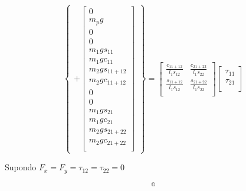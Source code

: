 \documentclass[12pt,a4paper]{article}
\begin{document}
\begin{equation}
\begin{Bmatrix}
	+
	\begin{bmatrix}
	0 \\
	m_p g \\
	0 \\
	0 \\
	m_1 g s_{11} \\
	m_1 g c_{11} \\
	m_2 g s_{11+12} \\
	m_2 g c_{11+12} \\
	0 \\
	0 \\
	m_1 g s_{21} \\
	m_1 g c_{21} \\
	m_2 g s_{21+22} \\
	m_2 g c_{21+22} \\
	\end{bmatrix}
\end{Bmatrix}
=
\begin{bmatrix}
\frac{c_{11+12}}{l_1 s_{12}} & \frac{c_{21+22}}{l_1 s_{22}}\\
\frac{s_{11+12}}{l_1 s_{12}} & \frac{s_{21+22}}{l_1 s_{22}}\\
\end{bmatrix}
\begin{bmatrix}
\tau_{11} \\
\tau_{21} \\
\end{bmatrix}
\end{equation}

Supondo $F_x = F_y = \tau_{12} = \tau_{22} = 0$

$$\mathbb{a}$$
\end{document}
